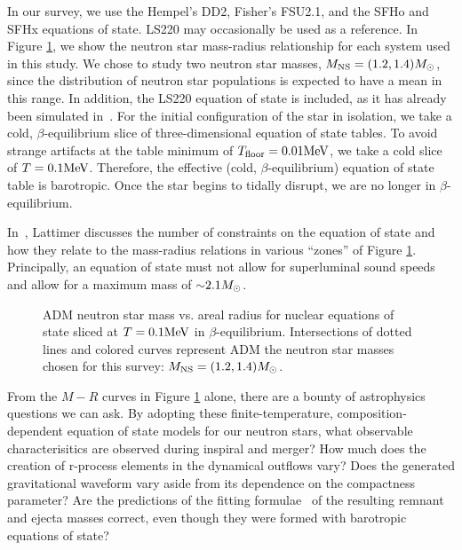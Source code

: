 In our survey, we use the Hempel's DD2, Fisher's FSU2.1, and the SFHo and SFHx equations of state.  
LS220 may occasionally be used as a reference. 
In Figure \ref{fig:MvsR}, we show the neutron star mass-radius relationship for each system used in this study. 
We chose to study two neutron star masses, $M_{\rm NS} = (1.2, 1.4) M_{\odot}$, since the distribution of neutron star populations is expected to have a mean in this range. 
In addition, the LS220 equation of state is included, as it has already been simulated in~\cite{Foucart:2014nda}.  
For the initial configuration of the star in isolation, we take a cold, $\beta$-equilibrium slice of three-dimensional equation of state tables.  
To avoid strange artifacts at the table minimum of $T_{\rm floor} = 0.01 {\rm MeV}$, we take a cold slice of  $T = 0.1 {\rm MeV}$.  Therefore, the effective (cold, $\beta$-equilibrium) equation of state table is barotropic. Once the star begins to tidally disrupt, we are no longer in $\beta$-equilibrium.

In~\cite{lattimer2016equation}, Lattimer discusses the number of constraints on the equation of state and how they relate to the mass-radius relations in various ``zones'' of Figure \ref{fig:MvsR}.  
Principally, an equation of state must not allow for superluminal sound speeds and allow for a maximum mass of $\mathord{\sim} 2.1 M_{\odot}$.

\begin{figure}
	\centering
	
	\caption[Neutron star mass vs. areal radius]{
		ADM neutron star mass vs. areal radius for nuclear equations of state sliced at $T=0.1{\rm MeV}$ in $\beta$-equilibrium.  Intersections of dotted lines and colored curves represent ADM the neutron star masses chosen for this survey: $M_{\rm NS} = (1.2, 1.4) M_{\odot}$.  
	}
	\label{fig:MvsR}
\end{figure}

From the $M-R$ curves in Figure \ref{fig:MvsR} alone, there are a bounty of astrophysics questions we can ask.  
By adopting these finite-temperature, composition-dependent equation of state models for our neutron stars, what observable characterisitics are observed during inspiral and merger?  
How much does the creation of r-process elements in the dynamical outflows vary?  
Does the generated gravitational waveform vary aside from its dependence on the compactness parameter?  
Are the predictions of the fitting formulae~\cite{foucart2012black,pannarale2014black,kawaguchi2016models} of the resulting remnant and ejecta masses correct, even though they were formed with barotropic equations of state?

